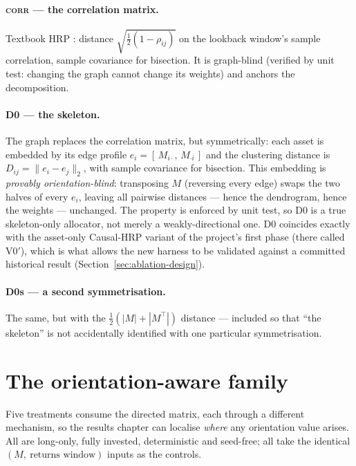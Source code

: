 \paragraph{\textsc{corr} --- the correlation matrix.} Textbook HRP
\cite{lopezdeprado2016hrp}: distance $\sqrt{\tfrac{1}{2}(1-\rho_{ij})}$ on the
lookback window's sample correlation, sample covariance for bisection. It is
graph-blind (verified by unit test: changing the graph cannot change its
weights) and anchors the decomposition.

\paragraph{D0 --- the skeleton.} The graph replaces the correlation matrix,
but symmetrically: each asset is embedded by its edge profile
$e_i = [\,M_{i\cdot},\, M_{\cdot i}\,]$ and the clustering distance is
$D_{ij} = \lVert e_i - e_j \rVert_2$, with sample covariance for bisection.
This embedding is \emph{provably orientation-blind}: transposing $M$
(reversing every edge) swaps the two halves of every $e_i$, leaving all
pairwise distances --- hence the dendrogram, hence the weights --- unchanged.
The property is enforced by unit test, so D0 is a true skeleton-only
allocator, not merely a weakly-directional one. D0 coincides exactly with the
asset-only Causal-HRP variant of the project's first phase (there called
V0$'$), which is what allows the new harness to be validated against a
committed historical result (Section~\ref{sec:ablation-design}).

\paragraph{D0s --- a second symmetrisation.} The same, but with the
$\tfrac{1}{2}(|M|+|M^\top|)$ distance --- included so that ``the skeleton''
is not accidentally identified with one particular symmetrisation.

\section{The orientation-aware family}
\label{sec:d-family}

Five treatments consume the directed matrix, each through a different
mechanism, so the results chapter can localise \emph{where} any orientation
value arises. All are long-only, fully invested, deterministic and seed-free;
all take the identical $(M,\ \text{returns window})$ inputs as the controls.

